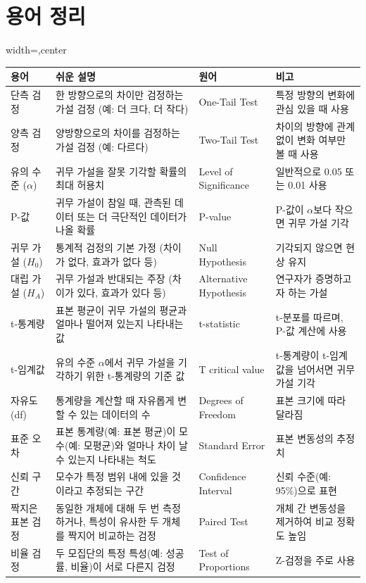 \documentclass[11pt,a4paper]{article}
\theoremstyle{definition}
\begin{document}
\section{용어 정리}
\begin{adjustbox}{width=\textwidth,center}
\begin{tabular}{llll}
\toprule
\textbf{용어} & \textbf{쉬운 설명} & \textbf{원어} & \textbf{비고} \\
\midrule
단측 검정 & 한 방향으로의 차이만 검정하는 가설 검정 (예: 더 크다, 더 작다) & One-Tail Test & 특정 방향의 변화에 관심 있을 때 사용 \\
양측 검정 & 양방향으로의 차이를 검정하는 가설 검정 (예: 다르다) & Two-Tail Test & 차이의 방향에 관계없이 변화 여부만 볼 때 사용 \\
유의 수준 ($\alpha$) & 귀무 가설을 잘못 기각할 확률의 최대 허용치 & Level of Significance & 일반적으로 0.05 또는 0.01 사용 \\
P-값 & 귀무 가설이 참일 때, 관측된 데이터 또는 더 극단적인 데이터가 나올 확률 & P-value & P-값이 $\alpha$보다 작으면 귀무 가설 기각 \\
귀무 가설 ($H_0$) & 통계적 검정의 기본 가정 (차이가 없다, 효과가 없다 등) & Null Hypothesis & 기각되지 않으면 현상 유지 \\
대립 가설 ($H_A$) & 귀무 가설과 반대되는 주장 (차이가 있다, 효과가 있다 등) & Alternative Hypothesis & 연구자가 증명하고자 하는 가설 \\
t-통계량 & 표본 평균이 귀무 가설의 평균과 얼마나 떨어져 있는지 나타내는 값 & t-statistic & t-분포를 따르며, P-값 계산에 사용 \\
t-임계값 & 유의 수준 $\alpha$에서 귀무 가설을 기각하기 위한 t-통계량의 기준 값 & T critical value & t-통계량이 t-임계값을 넘어서면 귀무 가설 기각 \\
자유도 (df) & 통계량을 계산할 때 자유롭게 변할 수 있는 데이터의 수 & Degrees of Freedom & 표본 크기에 따라 달라짐 \\
표준 오차 & 표본 통계량(예: 표본 평균)이 모수(예: 모평균)와 얼마나 차이 날 수 있는지 나타내는 척도 & Standard Error & 표본 변동성의 추정치 \\
신뢰 구간 & 모수가 특정 범위 내에 있을 것이라고 추정되는 구간 & Confidence Interval & 신뢰 수준(예: 95\%)으로 표현 \\
짝지은 표본 검정 & 동일한 개체에 대해 두 번 측정하거나, 특성이 유사한 두 개체를 짝지어 비교하는 검정 & Paired Test & 개체 간 변동성을 제거하여 비교 정확도 높임 \\
비율 검정 & 두 모집단의 특정 특성(예: 성공률, 비율)이 서로 다른지 검정 & Test of Proportions & Z-검정을 주로 사용 \\
\bottomrule
\end{tabular}
\end{adjustbox}
\end{document}

